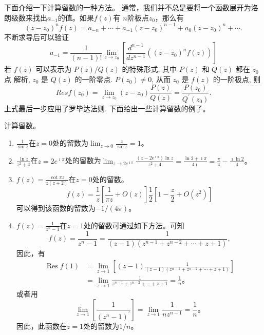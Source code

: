 下面介绍一下计算留数的一种方法。
通常，我们并不总是要将一个函数展开为洛朗级数来找出$a_{-1}$的值。如果$f(z)$有
$n$阶极点$z_0$，那么有
\begin{equation}
    \left(z-z_0\right)^n f(z)=a_{-n}+\cdots+a_{-1}\left(z-z_0\right)^{n-1}+a_0\left(z-z_0\right)^n+\cdots .
\end{equation}
不断求导后可以验证
\begin{equation}
    a_{-1}=\frac{1}{(n-1) !} \lim _{z \to z_0}\left[\frac{d^{n-1}}{d z^{n-1}}\left(\left(z-z_0\right)^n f(z)\right)\right]
\end{equation}
若 $f(z)$ 可以表示为 $P(z) / Q(z)$ 的特殊形式, 其中 $P(z)$ 和 $Q(z)$ 都在 $z_0$ 点 解析, $z_0$ 是 $Q(z)$ 的一阶零点. $P\left(z_0\right) \neq 0$, 从而 $z_0$ 是 $f(z)$ 的一阶极点, 则
\begin{equation}
    Res f\left(z_0\right)=\lim _{z \to z_0}\left(z-z_0\right) \frac{P(z)}{Q(z)}=\frac{P\left(z_0\right)}{Q^{\prime}\left(z_0\right)} .
\end{equation}
上式最后一步应用了罗毕达法则.
下面给出一些计算留数的例子。
\begin{examplebox}{计算留数。}
    
    \begin{enumerate}
        \item $\frac{1}{\sin z}$在$z=0$处的留数为$\lim_{z\to 0} \frac{z}{\sin{z}} = 1$。
        \item $\frac{\ln{z}}{z^2 + 4}$在$z=2e^{\imath \pi}$处的留数为$\lim_{z\to 2e^{\imath \pi}} \frac{(z-2e^{\imath \pi})\ln{z} }{z^2 + 4} = 
        \frac{\ln 2 + \imath \pi}{4\imath} = \frac{\pi}{4} - \frac{\imath\ln{2}}{4}\textrm{。}$
        \item $f(z) = \frac{\cot{\pi z}}{z(z+2)}$在$z=0$处的留数。\\
            \[
              f(z) = \frac{1}{z} \left[\frac{1}{\pi z} + O(z) \right]\frac{1}{2} \left[1 - \frac{z}{2} + O(z^2)\right]  
            \]
            可以得到该函数的留数为$-1/(4\pi)$。
        \item $f(z) = \frac{1}{z^n - 1}$在$z=1$处的留数可通过如下方法。可知
        \[
            f(z)=\frac{1}{z^n-1}=\frac{1}{(z-1)\left(z^{n-1}+z^{n-2}+\cdots+z+1\right)},
        \]
        因此，有
        \[
            \begin{aligned}
                \operatorname{Res} f(1) & =\lim _{z \to 1}\left[(z-1) \frac{1}{(z-1)\left(z^{n-1}+z^{n-2}+\cdots+z+1\right)}\right] \\
                & =\lim _{z \to 1} \frac{1}{z^{n-1}+z^{n-2}+\cdots+z+1}=\frac{1}{n} \textrm{。}
            \end{aligned}
        \]
        或者用 $$
        \lim _{z \to 1}\left[\frac{1}{\left(z^n-1\right)^{\prime}}\right]=\lim _{z \to 1} \frac{1}{n z^{n-1}}=\frac{1}{n} \textrm{。}
        $$ 因此，此函数在$z=1$处的留数为$1/n$。
    \end{enumerate}
\end{examplebox}


